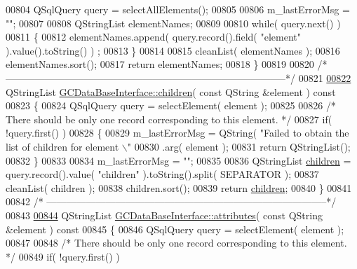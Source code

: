 \begin{DoxyCode}
{{{{{{{{{{{{{{{{{{{{{{{{{{{{{{00804   QSqlQuery query = selectAllElements();
00805 
00806   m\_lastErrorMsg = \textcolor{stringliteral}{""};
00807 
00808   QStringList elementNames;
00809 
00810   \textcolor{keywordflow}{while}( query.next() )
00811   \{
00812     elementNames.append( query.record().field( \textcolor{stringliteral}{"element"} ).value().toString() )
      ;
00813   \}
00814 
00815   cleanList( elementNames );
00816   elementNames.sort();
00817   \textcolor{keywordflow}{return} elementNames;
00818 \}
00819 
00820 \textcolor{comment}{/*
      --------------------------------------------------------------------------------------*/}
00821 
\hypertarget{gcdatabaseinterface_8cpp_source_l00822}{}\hyperlink{class_g_c_data_base_interface_aab5126783bc3acc7c718c8ffd8af62bc}{00822} QStringList \hyperlink{class_g_c_data_base_interface_aab5126783bc3acc7c718c8ffd8af62bc}{GCDataBaseInterface::children}( \textcolor{keyword}{const} QString &element )\textcolor{keyword}{ const}
00823 \textcolor{keyword}{}\{
00824   QSqlQuery query = selectElement( element );
00825 
00826   \textcolor{comment}{/* There should be only one record corresponding to this element. */}
00827   \textcolor{keywordflow}{if}( !query.first() )
00828   \{
00829     m\_lastErrorMsg = QString( \textcolor{stringliteral}{"Failed to obtain the list of children for
       element \(\backslash\)"%
00830         .arg( element );
00831     \textcolor{keywordflow}{return} QStringList();
00832   \}
00833 
00834   m\_lastErrorMsg = \textcolor{stringliteral}{""};
00835 
00836   QStringList \hyperlink{class_g_c_data_base_interface_aab5126783bc3acc7c718c8ffd8af62bc}{children} = query.record().value( \textcolor{stringliteral}{"children"} ).toString().split( 
      SEPARATOR );
00837   cleanList( children );
00838   children.sort();
00839   \textcolor{keywordflow}{return} \hyperlink{class_g_c_data_base_interface_aab5126783bc3acc7c718c8ffd8af62bc}{children};
00840 \}
00841 
00842 \textcolor{comment}{/*
      --------------------------------------------------------------------------------------*/}
00843 
\hypertarget{gcdatabaseinterface_8cpp_source_l00844}{}\hyperlink{class_g_c_data_base_interface_afb1e49e08f98ca453f9ac66340a35642}{00844} QStringList \hyperlink{class_g_c_data_base_interface_afb1e49e08f98ca453f9ac66340a35642}{GCDataBaseInterface::attributes}( \textcolor{keyword}{const} QString &element )\textcolor{keyword}{ const}
00845 \textcolor{keyword}{}\{
00846   QSqlQuery query = selectElement( element );
00847 
00848   \textcolor{comment}{/* There should be only one record corresponding to this element. */}
00849   \textcolor{keywordflow}{if}( !query.first() )
}}}}}}}}}}}}}}}}}}}}}}}}}}}}}}}
\end{DoxyCode}
